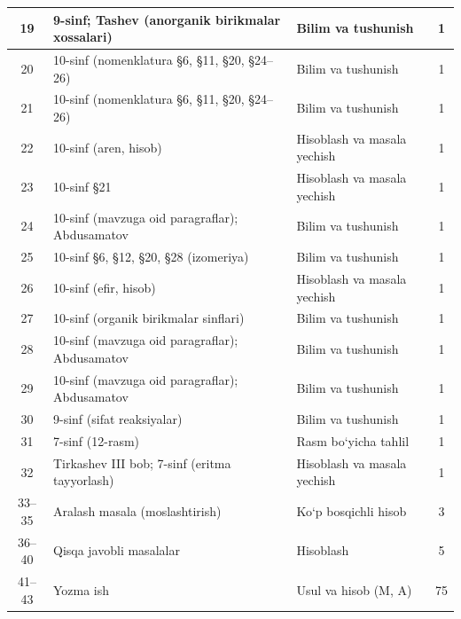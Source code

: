 \documentclass[11pt,a4paper]{article}
\begin{document}
{\begin{longtable}{|c|p{7.2cm}|p{5.4cm}|c|}
19 & 9-sinf; Tashev (anorganik birikmalar xossalari) & Bilim va tushunish & 1\\\hline
20 & 10-sinf (nomenklatura \S{}6, \S{}11, \S{}20, \S{}24--26) & Bilim va tushunish & 1\\\hline
21 & 10-sinf (nomenklatura \S{}6, \S{}11, \S{}20, \S{}24--26) & Bilim va tushunish & 1\\\hline
22 & 10-sinf (aren, hisob) & Hisoblash va masala yechish & 1\\\hline
23 & 10-sinf \S{}21 & Hisoblash va masala yechish & 1\\\hline
24 & 10-sinf (mavzuga oid paragraflar); Abdusamatov & Bilim va tushunish & 1\\\hline
25 & 10-sinf \S{}6, \S{}12, \S{}20, \S{}28 (izomeriya) & Bilim va tushunish & 1\\\hline
26 & 10-sinf (efir, hisob) & Hisoblash va masala yechish & 1\\\hline
27 & 10-sinf (organik birikmalar sinflari) & Bilim va tushunish & 1\\\hline
28 & 10-sinf (mavzuga oid paragraflar); Abdusamatov & Bilim va tushunish & 1\\\hline
29 & 10-sinf (mavzuga oid paragraflar); Abdusamatov & Bilim va tushunish & 1\\\hline
30 & 9-sinf (sifat reaksiyalar) & Bilim va tushunish & 1\\\hline
31 & 7-sinf (12-rasm) & Rasm bo`yicha tahlil & 1\\\hline
32 & Tirkashev III bob; 7-sinf (eritma tayyorlash) & Hisoblash va masala yechish & 1\\\hline
33--35 & Aralash masala (moslashtirish) & Ko`p bosqichli hisob & 3\\\hline
36--40 & Qisqa javobli masalalar & Hisoblash & 5\\\hline
41--43 & Yozma ish & Usul va hisob (M, A) & 75\\\hline
\end{longtable}}
\end{document}
